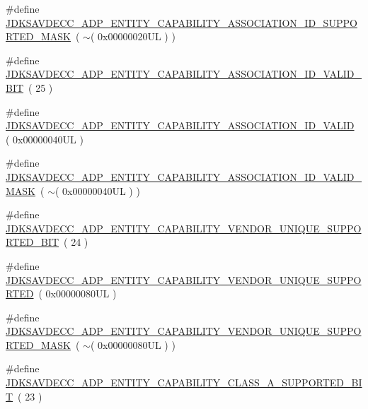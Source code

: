 \begin{DoxyCompactItemize}
\item 
\#define \hyperlink{group__adp__entity__capability_gab06494bad690d1c5c20186cbe6761bbb}{J\+D\+K\+S\+A\+V\+D\+E\+C\+C\+\_\+\+A\+D\+P\+\_\+\+E\+N\+T\+I\+T\+Y\+\_\+\+C\+A\+P\+A\+B\+I\+L\+I\+T\+Y\+\_\+\+A\+S\+S\+O\+C\+I\+A\+T\+I\+O\+N\+\_\+\+I\+D\+\_\+\+S\+U\+P\+P\+O\+R\+T\+E\+D\+\_\+\+M\+A\+SK}~( $\sim$( 0x00000020\+U\+L ) )
\item 
\#define \hyperlink{group__adp__entity__capability_gac6ef045be4cfcb8da7516cfec726aec9}{J\+D\+K\+S\+A\+V\+D\+E\+C\+C\+\_\+\+A\+D\+P\+\_\+\+E\+N\+T\+I\+T\+Y\+\_\+\+C\+A\+P\+A\+B\+I\+L\+I\+T\+Y\+\_\+\+A\+S\+S\+O\+C\+I\+A\+T\+I\+O\+N\+\_\+\+I\+D\+\_\+\+V\+A\+L\+I\+D\+\_\+\+B\+IT}~( 25 )
\item 
\#define \hyperlink{group__adp__entity__capability_gae8a98a204909a95ae1bbcf3e7f231318}{J\+D\+K\+S\+A\+V\+D\+E\+C\+C\+\_\+\+A\+D\+P\+\_\+\+E\+N\+T\+I\+T\+Y\+\_\+\+C\+A\+P\+A\+B\+I\+L\+I\+T\+Y\+\_\+\+A\+S\+S\+O\+C\+I\+A\+T\+I\+O\+N\+\_\+\+I\+D\+\_\+\+V\+A\+L\+ID}~( 0x00000040\+U\+L )
\item 
\#define \hyperlink{group__adp__entity__capability_gae2c01bf5d3911dd2f81c23e294faf117}{J\+D\+K\+S\+A\+V\+D\+E\+C\+C\+\_\+\+A\+D\+P\+\_\+\+E\+N\+T\+I\+T\+Y\+\_\+\+C\+A\+P\+A\+B\+I\+L\+I\+T\+Y\+\_\+\+A\+S\+S\+O\+C\+I\+A\+T\+I\+O\+N\+\_\+\+I\+D\+\_\+\+V\+A\+L\+I\+D\+\_\+\+M\+A\+SK}~( $\sim$( 0x00000040\+U\+L ) )
\item 
\#define \hyperlink{group__adp__entity__capability_ga7a95e8d816748b74067e594eba8f96f9}{J\+D\+K\+S\+A\+V\+D\+E\+C\+C\+\_\+\+A\+D\+P\+\_\+\+E\+N\+T\+I\+T\+Y\+\_\+\+C\+A\+P\+A\+B\+I\+L\+I\+T\+Y\+\_\+\+V\+E\+N\+D\+O\+R\+\_\+\+U\+N\+I\+Q\+U\+E\+\_\+\+S\+U\+P\+P\+O\+R\+T\+E\+D\+\_\+\+B\+IT}~( 24 )
\item 
\#define \hyperlink{group__adp__entity__capability_ga4aa351ae78ccd69934182279ed79d61f}{J\+D\+K\+S\+A\+V\+D\+E\+C\+C\+\_\+\+A\+D\+P\+\_\+\+E\+N\+T\+I\+T\+Y\+\_\+\+C\+A\+P\+A\+B\+I\+L\+I\+T\+Y\+\_\+\+V\+E\+N\+D\+O\+R\+\_\+\+U\+N\+I\+Q\+U\+E\+\_\+\+S\+U\+P\+P\+O\+R\+T\+ED}~( 0x00000080\+U\+L )
\item 
\#define \hyperlink{group__adp__entity__capability_ga2e2bb8dd7d14ef521016bea5287584a6}{J\+D\+K\+S\+A\+V\+D\+E\+C\+C\+\_\+\+A\+D\+P\+\_\+\+E\+N\+T\+I\+T\+Y\+\_\+\+C\+A\+P\+A\+B\+I\+L\+I\+T\+Y\+\_\+\+V\+E\+N\+D\+O\+R\+\_\+\+U\+N\+I\+Q\+U\+E\+\_\+\+S\+U\+P\+P\+O\+R\+T\+E\+D\+\_\+\+M\+A\+SK}~( $\sim$( 0x00000080\+U\+L ) )
\item 
\#define \hyperlink{group__adp__entity__capability_ga6480beff00d8dd12ba99ac132d53f0d1}{J\+D\+K\+S\+A\+V\+D\+E\+C\+C\+\_\+\+A\+D\+P\+\_\+\+E\+N\+T\+I\+T\+Y\+\_\+\+C\+A\+P\+A\+B\+I\+L\+I\+T\+Y\+\_\+\+C\+L\+A\+S\+S\+\_\+\+A\+\_\+\+S\+U\+P\+P\+O\+R\+T\+E\+D\+\_\+\+B\+IT}~( 23 )

\end{DoxyCompactItemize}
